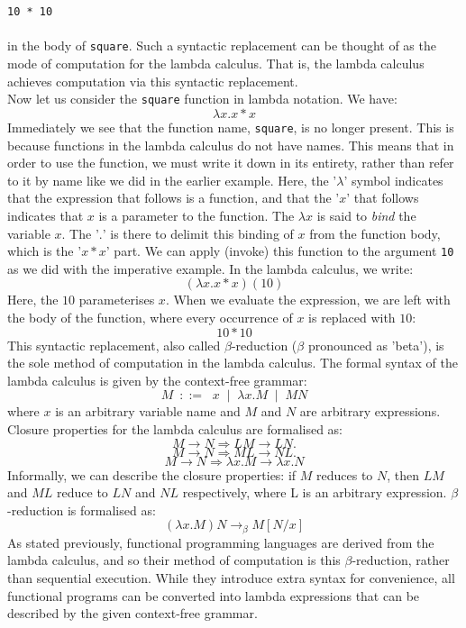 \documentclass{article}
\begin{document}
\\\\
\indent \texttt{10 * 10}
\\\\
in the body of \texttt{square}. Such a syntactic replacement can be thought of as the mode of computation for the lambda calculus. That is, the lambda calculus achieves computation via this syntactic replacement.
\\
\indent Now let us consider the \texttt{square} function in lambda notation. We have:
\[ \lambda x.x * x \]
Immediately we see that the function name, \texttt{square}, is no longer present. This is because functions in the lambda calculus do not have names. This means that in order to use the function, we must write it down in its entirety, rather than refer to it by name like we did in the earlier example. Here, the '$\lambda$' symbol indicates that the expression that follows is a function, and that the '$x$' that follows indicates that $x$ is a parameter to the function. The $\lambda x$ is said to \emph{bind} the variable $x$. The '$.$' is there to delimit this binding of $x$ from the function body, which is the '$x * x$' part. We can apply (invoke) this function to the argument \texttt{10} as we did with the imperative example. In the lambda calculus, we write:
\[ (\lambda x.x * x)(10) \]
Here, the $10$ parameterises $x$. When we evaluate the expression, we are left with the body of the function, where every occurrence of $x$ is replaced with $10$:
\[ 10 * 10 \]
This syntactic replacement, also called $\beta$-reduction ($\beta$ pronounced as 'beta'), is the sole method of computation in the lambda calculus. The formal syntax of the lambda calculus is given by the context-free grammar:
\[ M \:\; ::= \;\; x \;\; | \;\; \lambda x.M \;\; | \;\;  MN \]
where $x$ is an arbitrary variable name and $M$ and $N$ are arbitrary expressions. Closure properties for the lambda calculus are formalised as:
\[ M \rightarrow N \Rightarrow LM \rightarrow LN. \]
\[ M \rightarrow N \Rightarrow ML \rightarrow NL. \]
\[ M \rightarrow N \Rightarrow \lambda x.M \rightarrow \lambda x.N \]
Informally, we can describe the closure properties: if $M$ reduces to $N$, then $LM$ and $ML$ reduce to $LN$ and $NL$ respectively, where L is an arbitrary expression. $\beta$-reduction is formalised as:
\[ (\lambda x.M)N \rightarrow_\beta M[N/x] \]
\indent As stated previously, functional programming languages are derived from the lambda calculus, and so their method of computation is this $\beta$-reduction, rather than sequential execution. While they introduce extra syntax for convenience, all functional programs can be converted into lambda expressions that can be described by the given context-free grammar.
\end{document}
